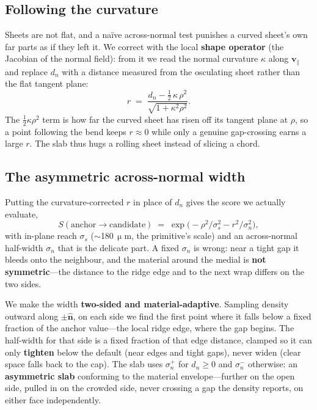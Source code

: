 \documentclass[10pt,twocolumn,a4paper]{article}
\newcommand{\um}{\ensuremath{\,\upmu\mathrm{m}}}      %
\newcommand{\nhat}{\ensuremath{\hat{\mathbf{n}}}}
\begin{document}
\subsection{Following the curvature}\label{sec:curv}
Sheets are not flat, and a na\"ive across-normal test punishes a curved sheet's
own far parts as if they left it. We correct with the local \textbf{shape
operator} (the Jacobian of the normal field): from it we read the normal
curvature $\kappa$ along $\mathbf{v}_\parallel$ and replace $d_n$ with a distance
measured from the osculating sheet rather than the flat tangent plane:
\begin{equation}
  r \;=\; \frac{d_n - \tfrac12\,\kappa\,\rho^2}{\sqrt{1+\kappa^2\rho^2}}.
\end{equation}
The $\tfrac12\kappa\rho^2$ term is how far the curved sheet has risen off its
tangent plane at $\rho$, so a point following the bend keeps $r\approx0$ while
only a genuine gap-crossing earns a large $r$. The slab thus hugs a rolling sheet
instead of slicing a chord.

\subsection{The asymmetric across-normal width}\label{sec:asym}
Putting the curvature-corrected $r$ in place of $d_n$ gives the score we actually
evaluate,
\begin{equation}
  S(\text{anchor}\to\text{candidate}) \;=\;
  \exp\!\Big(-\rho^2/\sigma_s^2 - r^2/\sigma_n^2\Big),
\end{equation}
with in-plane reach $\sigma_s$ ($\sim$180\um, the primitive's scale) and an
across-normal half-width $\sigma_n$ that is the delicate part. A fixed $\sigma_n$
is wrong: near a tight gap it bleeds onto the neighbour, and the material around
the medial is \textbf{not symmetric}---the distance to the ridge edge and to the
next wrap differs on the two sides.

We make the width \textbf{two-sided and material-adaptive}. Sampling density
outward along $\pm\nhat$, on each side we find the first point where it falls
below a fixed fraction of the anchor value---the local ridge edge, where the gap
begins. The half-width for that side is a fixed fraction of that edge distance,
clamped so it can only \textbf{tighten} below the default (near edges and tight
gaps), never widen (clear space falls back to the cap). The slab uses
$\sigma_n^{+}$ for $d_n\ge0$ and $\sigma_n^{-}$ otherwise: an \textbf{asymmetric
slab} conforming to the material envelope---further on the open side, pulled in on
the crowded side, never crossing a gap the density reports, on either face
independently.
\end{document}
